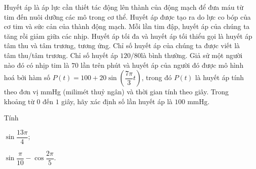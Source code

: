 \begin{ex}%
	Huyết áp là áp lực cần thiết tác động lên thành của động mạch để đưa máu từ tim đến nuôi dưỡng các mô trong cơ thể. Huyết áp được tạo ra do lực co bóp của cơ tim và sức cản của thành động mạch. Mỗi lần tim đập, huyết áp của chúng ta tăng rồi giảm giữa các nhịp. Huyết áp tối đa và huyết áp tối thiểu gọi là huyết áp tâm thu và tâm trương, tương ứng. Chỉ số huyết áp của chúng ta được viết là tâm thu/tâm trương. Chỉ số huyết áp $120 / 80 $là bình thường. Giả sử một người nào đó có nhịp tim là $70$ lần trên phút và huyết áp của người đó được mô hình hoá bởi hàm số $P(t)=100+20\sin \left(\dfrac{7\pi}{3}t\right)$, trong đó $P(t)$ là huyết áp tính theo đơn vị mmHg (milimét thuỷ ngân) và thời gian tính theo giây. Trong khoảng từ $0$ đến $1$ giây, hãy xác định số lần huyết áp là $100$ mmHg.
\end{ex}

\begin{vd}%
	Tính 
	\begin{listEX}[2]
		\item $\sin \dfrac{13\pi}{4}$;
		\item $\sin \dfrac{\pi}{10}-\cos \dfrac{2\pi}{5}$.
	\end{listEX}
\end{vd}

